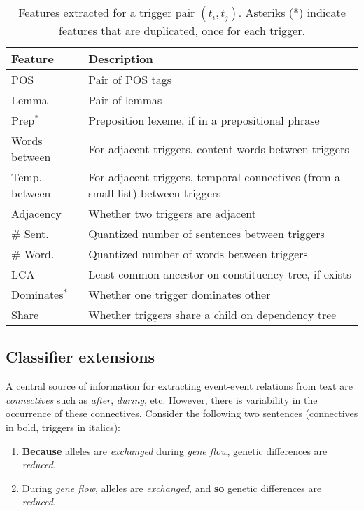 \begin{table}[t]
{\footnotesize
\hfill{}
\begin{tabular}{|p{2.4cm}|p{4.7cm}|}
\hline
\textbf{Feature} &\textbf{Description}\\
\hline
 POS & Pair of POS tags \\
Lemma & Pair of lemmas \\
Prep$^*$ & Preposition lexeme, if in a prepositional phrase \\
Words between  & For adjacent triggers, content words between triggers \\
Temp. between & For adjacent triggers, temporal connectives (from a small list) between triggers \\
Adjacency & Whether two triggers are adjacent \\
\# Sent. & Quantized number of sentences between triggers \\
\# Word. & Quantized number of words between triggers \\
LCA & Least common ancestor on constituency tree, if exists \\
Dominates$^*$ & Whether one trigger dominates other \\
Share & Whether triggers share a child on dependency tree \\
\hline
\end{tabular}}
\hfill{}
\caption{Features extracted for a trigger pair $(t_i,t_j)$. Asteriks (*) indicate features that are duplicated, once for each trigger.}
\label{tab:features}
\end{table}

\subsection{Classifier extensions} \label{subsec:pairwise-novel}

A central source of information for extracting event-event relations from text are \emph{connectives} such as \emph{after}, \emph{during}, etc. However, there is variability in the occurrence of these connectives. Consider the following two sentences (connectives in bold, triggers in italics):

\begin{enumerate}[itemsep=0pt,topsep=0pt] 
\item \footnotesize \textbf{Because} alleles are \emph{exchanged} during \emph{gene flow}, genetic differences are \emph{reduced}. \label{sent:1}
\item \footnotesize During \emph{gene flow}, alleles are \emph{exchanged}, and \textbf{so} genetic differences are \emph{reduced}. \label{sent:2}
\end{enumerate}


